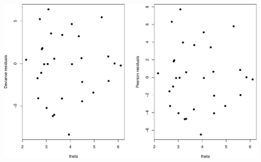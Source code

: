 \documentclass[
  ignorenonframetext,
]{beamer}
\begin{document}
\begin{frame}[fragile]{}
\includegraphics{week4_p2_files/figure-beamer/unnamed-chunk-28-1.pdf}
\end{frame}
\end{document}
